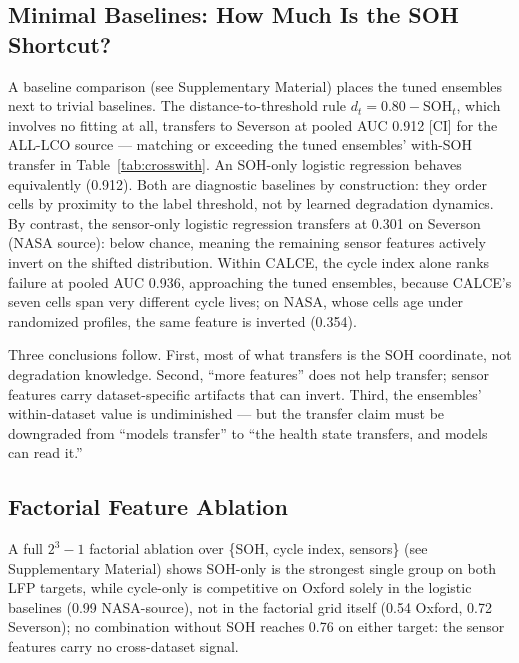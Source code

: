 \documentclass[preprint,12pt]{elsarticle}
\begin{document}
\subsection{Minimal Baselines: How Much Is the SOH Shortcut?}
A baseline comparison (see Supplementary Material) places the tuned ensembles next to trivial baselines. The distance-to-threshold rule $d_t = 0.80 - \mathrm{SOH}_t$, which involves no fitting at all, transfers to Severson at pooled AUC 0.912 [CI] for the ALL-LCO source --- matching or exceeding the tuned ensembles' with-SOH transfer in Table~\ref{tab:crosswith}. An SOH-only logistic regression behaves equivalently (0.912). Both are diagnostic baselines by construction: they order cells by proximity to the label threshold, not by learned degradation dynamics. By contrast, the sensor-only logistic regression transfers at 0.301 on Severson (NASA source): below chance, meaning the remaining sensor features actively invert on the shifted distribution. Within CALCE, the cycle index alone ranks failure at pooled AUC 0.936, approaching the tuned ensembles, because CALCE's seven cells span very different cycle lives; on NASA, whose cells age under randomized profiles, the same feature is inverted (0.354).

Three conclusions follow. First, most of what transfers is the SOH coordinate, not degradation knowledge. Second, ``more features'' does not help transfer; sensor features carry dataset-specific artifacts that can invert. Third, the ensembles' within-dataset value is undiminished --- but the transfer claim must be downgraded from ``models transfer'' to ``the health state transfers, and models can read it.''



\subsection{Factorial Feature Ablation}
A full $2^3-1$ factorial ablation over \{SOH, cycle index, sensors\} (see Supplementary Material) shows SOH-only is the strongest single group on both LFP targets, while cycle-only is competitive on Oxford solely in the logistic baselines (0.99 NASA-source), not in the factorial grid itself (0.54 Oxford, 0.72 Severson); no combination without SOH reaches 0.76 on either target: the sensor features carry no cross-dataset signal.
\end{document}
